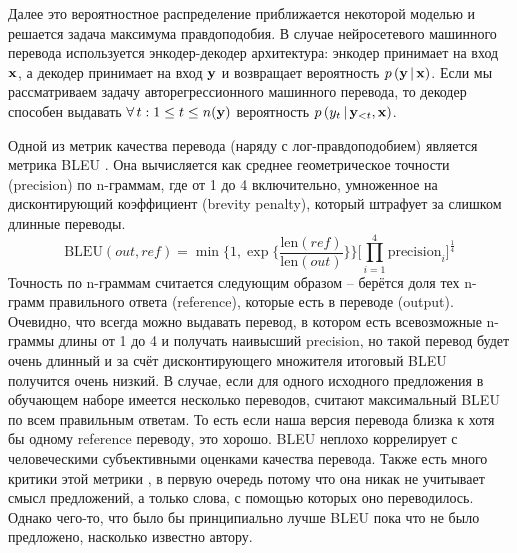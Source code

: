 \documentclass[a4paper, 12pt]{extarticle}
\begin{document}
    Далее это вероятностное распределение приближается некоторой моделью и решается задача максимума правдоподобия. В случае нейросетевого машинного перевода используется энкодер-декодер архитектура: энкодер принимает на вход $\bold{x}$, а декодер принимает на вход $\bold{y}$ и возвращает вероятность $p \, (\bold{y} \, | \, \bold{x})$. Если мы рассматриваем задачу авторегрессионного машинного перевода, то декодер способен выдавать $\forall \, t: 1 \leq t \leq n(\bold{y})$ вероятность $p \, (y_t \, | \, \bold{y}_{< t}, \bold{x} )$.

    Одной из метрик качества перевода (наряду с лог-правдоподобием) является метрика BLEU \cite{bleu}. Она вычисляется как среднее геометрическое точности (precision) по n-граммам, где от 1 до 4 включительно, умноженное на дисконтирующий коэффициент (brevity penalty), который штрафует за слишком длинные переводы. $$\textrm{BLEU}(out, ref) = \min \Bigg\{ 1, \exp \Big\{ \frac{\textrm{len}(ref)}{\textrm{len}(out)} \Big\} \Bigg\} \Big[ \prod\limits_{i=1}^4 \textrm{precision}_i \Big]^{\frac{1}{4}}$$
Точность по n-граммам считается следующим образом -- берётся доля тех n-грамм правильного ответа (reference), которые есть в переводе (output). Очевидно, что всегда можно выдавать перевод, в котором есть всевозможные n-граммы длины от 1 до 4 и получать наивысший precision, но такой перевод будет очень длинный и за счёт дисконтирующего множителя итоговый BLEU получится очень низкий. В случае, если для одного исходного предложения в обучающем наборе имеется несколько переводов, считают максимальный BLEU по всем правильным ответам. То есть если наша версия перевода близка к хотя бы одному reference переводу, это хорошо. BLEU неплохо коррелирует с человеческими субъективными оценками качества перевода. Также есть много критики этой метрики \cite{bleu-critics}, в первую очередь потому что она никак не учитывает смысл предложений, а только слова, с помощью которых оно переводилось. Однако чего-то, что было бы принципиально лучше BLEU пока что не было предложено, насколько известно автору.
\end{document}
